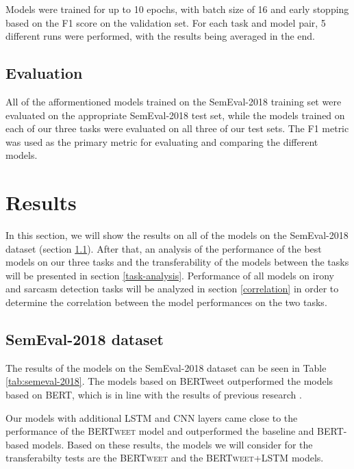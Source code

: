 \documentclass[10pt, a4paper]{article}
\begin{document}
Models were trained for up to 10 epochs, with batch size of 16 and early stopping based on the F1 score on the validation set.
For each task and model pair, 5 different runs were performed, with the results being averaged in the end.

\subsection{Evaluation}
All of the afformentioned models trained on the SemEval-2018 training set were evaluated on the appropriate 
SemEval-2018 test set, while the models trained on each of our three tasks were evaluated on all three of our test sets. 
The F1 metric was used as the primary metric for evaluating and comparing the different models.

\section{Results}

In this section, we will show the results on all of the models on the SemEval-2018 dataset (section \ref{semeval-results}).
After that, an analysis of the performance of the best models on our three tasks and the transferability of the models between
the tasks will be presented in section \ref{task-analysis}. Performance of all models on irony and sarcasm detection tasks
will be analyzed in section \ref{correlation} in order to determine the correlation between the model performances on the two tasks.

\subsection{SemEval-2018 dataset}\label{semeval-results}

The results of the models on the SemEval-2018 dataset can be seen in Table \ref{tab:semeval-2018}. The models based on
BERTweet outperformed the models based on BERT, which is in line with the results of previous research \citep{bertweet}.

Our models with additional LSTM and CNN layers came close to the performance of the \textsc{BERTweet} model and outperformed
the baseline and BERT-based models. Based on these results, the models we will consider for the transferabilty tests are the
\textsc{BERTweet} and the \textsc{BERTweet+LSTM} models.
\end{document}
